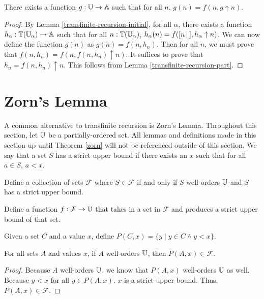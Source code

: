 \documentclass[../math.tex]{subfiles}
\begin{document}
\begin{theorem}
    There exists a function $g : \mathbb{U} \to \mathbb{A}$ such that for all $n$, $g(n) = f(n,
    g \uparrow n)$.
\end{theorem}
\begin{proof}
    By Lemma \ref{transfinite-recursion-initial}, for all $\alpha$, there exists
    a function $h_\alpha : \mathbb{T}(\mathbb{U}_\alpha) \to \mathbb{A}$ such that for all $n :
    \mathbb{T}(\mathbb{U}_\alpha)$, $h_\alpha(n) = f([ n\, |\,], h_\alpha \uparrow n)$.  We can now
    define the function $g(n)$ as $g(n) = f(n, h_n)$.  Then for all $n$, we must
    prove that $f(n, h_n) = f(n, f(n, h_n) \uparrow n)$.  It suffices to prove
    that $h_n = f(n, h_n) \uparrow n$.  This follows from Lemma
    \ref{transfinite-recursion-part}.
\end{proof}

\section{Zorn's Lemma}

A common alternative to transfinite recursion is Zorn's Lemma.  Throughout this
section, let $\mathbb{U}$ be a partially-ordered set.  All lemmas and definitions made
in this section up until Theorem \ref{zorn} will not be referenced outside of
this section.  We say that a set $S$ has a strict upper bound if there exists an
$x$ such that for all $a \in S$, $a < x$.

\begin{definition}
    Define a collection of sets $\mathcal F$ where $S \in \mathcal F$ if and
    only if $S$ well-orders $\mathbb{U}$ and $S$ has a strict upper bound.
\end{definition}

\begin{definition}
    Define a function $f : \mathcal F \rightarrow \mathbb{U}$ that takes in a set in
    $\mathcal F$ and produces a strict upper bound of that set.
\end{definition}

\begin{definition}
    Given a set $C$ and a value $x$, define $P(C, x) = \{y \mid y \in C \wedge y
    < x\}$.
\end{definition}

\begin{lemma}
    For all sets $A$ and values $x$, if $A$ well-orders $\mathbb{U}$, then $P(A, x) \in
    \mathcal F$.
\end{lemma}
\begin{proof}
    Because $A$ well-orders $\mathbb{U}$, we know that $P(A, x)$ well-orders $\mathbb{U}$ as
    well.  Because $y < x$ for all $y \in P(A, x)$, $x$ is a strict upper bound.
    Thus, $P(A, x) \in \mathcal F$.
\end{proof}
\end{document}
